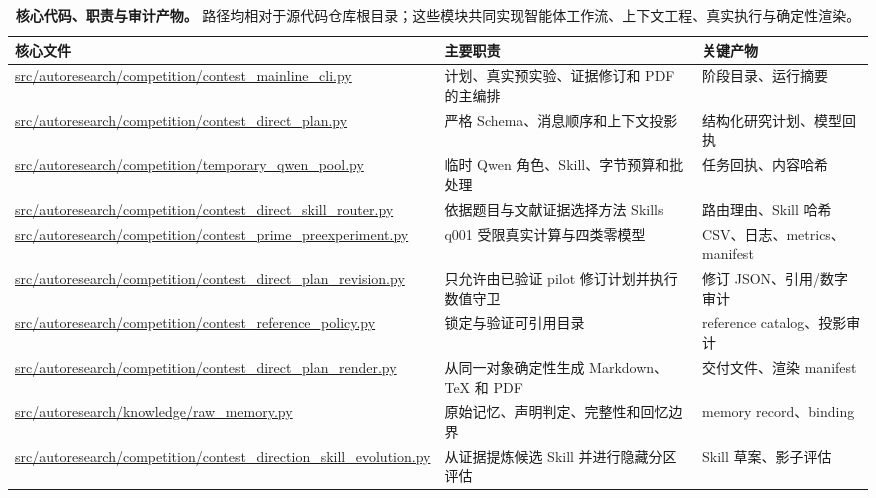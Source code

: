 \documentclass[12pt]{article}
\begin{document}
\begin{table}[p]
	\centering
	\footnotesize
	\caption{\textbf{核心代码、职责与审计产物。} 路径均相对于源代码仓库根目录；这些模块共同实现智能体工作流、上下文工程、真实执行与确定性渲染。}
	\label{tab:code}
	\begin{tabular}{p{}p{}p{}}
		\\
		\hline
		核心文件 & 主要职责 & 关键产物\\
		\hline
		\url{src/autoresearch/competition/contest_mainline_cli.py} & 计划、真实预实验、证据修订和 PDF 的主编排 & 阶段目录、运行摘要\\
		\url{src/autoresearch/competition/contest_direct_plan.py} & 严格 Schema、消息顺序和上下文投影 & 结构化研究计划、模型回执\\
		\url{src/autoresearch/competition/temporary_qwen_pool.py} & 临时 Qwen 角色、Skill、字节预算和批处理 & 任务回执、内容哈希\\
		\url{src/autoresearch/competition/contest_direct_skill_router.py} & 依据题目与文献证据选择方法 Skills & 路由理由、Skill 哈希\\
		\url{src/autoresearch/competition/contest_prime_preexperiment.py} & q001 受限真实计算与四类零模型 & CSV、日志、metrics、manifest\\
		\url{src/autoresearch/competition/contest_direct_plan_revision.py} & 只允许由已验证 pilot 修订计划并执行数值守卫 & 修订 JSON、引用/数字审计\\
		\url{src/autoresearch/competition/contest_reference_policy.py} & 锁定与验证可引用目录 & reference catalog、投影审计\\
		\url{src/autoresearch/competition/contest_direct_plan_render.py} & 从同一对象确定性生成 Markdown、TeX 和 PDF & 交付文件、渲染 manifest\\
		\url{src/autoresearch/knowledge/raw_memory.py} & 原始记忆、声明判定、完整性和回忆边界 & memory record、binding\\
		\url{src/autoresearch/competition/contest_direction_skill_evolution.py} & 从证据提炼候选 Skill 并进行隐藏分区评估 & Skill 草案、影子评估\\
		\hline
	\end{tabular}
\end{table}

\clearpage




\end{document}
